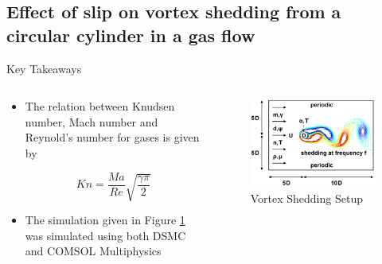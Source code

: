 \documentclass{beamer}
\begin{document}
    \subsection{Effect of slip on vortex shedding from a circular cylinder in a gas flow \cite{gallis2021effect}}

        \begin{frame}{Key Takeaways}
            \begin{columns}
                \begin{column}{0.5\linewidth}
                    \begin{itemize}
                        \setlength\itemsep{0.25cm}
                                
                        \item<1->The relation between Knudsen number, Mach number and Reynold's number for gases is given by
        
                            \begin{equation*}
                                Kn = \frac{Ma}{Re} \sqrt{\frac{\gamma \pi}{2}}
                            \end{equation*}
        
                        \item<2-> The simulation given in Figure \ref{img:Vortex} was simulated using both DSMC and COMSOL Multiphysics
                    \end{itemize}                    
                \end{column} 
            
                \begin{column}{0.5\linewidth}
                    \begin{figure}
                        \centering
                        \includegraphics[width=\linewidth]{Pictures/Literature/Vortex_Shedding.png}
                        \caption{Vortex Shedding Setup}
                        \label{img:Vortex}
                    \end{figure}
                \end{column}
            \end{columns}
        \end{frame}
        
\end{document}
